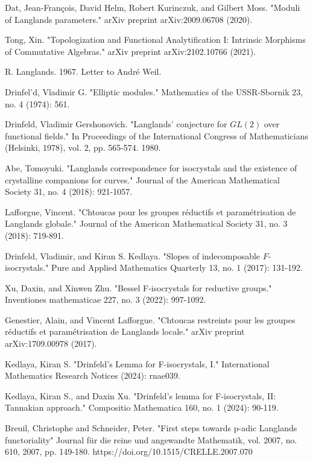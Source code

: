 \documentclass[12pt]{article}
\theoremstyle{definition}
\begin{document}
\newpage
\begin{thebibliography}{}

 Dat, Jean-Fran\c{c}ois, David Helm, Robert Kurinczuk, and Gilbert Moss. "Moduli of Langlands parameters." arXiv preprint arXiv:2009.06708 (2020).

 Tong, Xin. "Topologization and Functional Analytification I: Intrinsic Morphisms of Commutative Algebras." arXiv preprint arXiv:2102.10766 (2021).

 R. Langlands. 1967. Letter to Andr\'e Weil.

 Drinfel'd, Vladimir G. "Elliptic modules." Mathematics of the USSR-Sbornik 23, no. 4 (1974): 561.

 Drinfeld, Vladimir Gershonovich. "Langlands' conjecture for $GL(2)$ over functional fields." In Proceedings of the International Congress of Mathematicians (Helsinki, 1978), vol. 2, pp. 565-574. 1980.

 Abe, Tomoyuki. "Langlands correspondence for isocrystals and the existence of crystalline companions for curves." Journal of the American Mathematical Society 31, no. 4 (2018): 921-1057.

 Lafforgue, Vincent. "Chtoucas pour les groupes r\'eductifs et param\'etrisation de Langlands globale." Journal of the American Mathematical Society 31, no. 3 (2018): 719-891.

 Drinfeld, Vladimir, and Kiran S. Kedlaya. "Slopes of indecomposable $ F $-isocrystals." Pure and Applied Mathematics Quarterly 13, no. 1 (2017): 131-192.

 Xu, Daxin, and Xinwen Zhu. "Bessel F-isocrystals for reductive groups." Inventiones mathematicae 227, no. 3 (2022): 997-1092.

 Genestier, Alain, and Vincent Lafforgue. "Chtoucas restreints pour les groupes r\'eductifs et param\'etrisation de Langlands locale." arXiv preprint arXiv:1709.00978 (2017).

 Kedlaya, Kiran S. "Drinfeld's Lemma for F-isocrystals, I." International Mathematics Research Notices (2024): rnae039. 

 Kedlaya, Kiran S., and Daxin Xu. "Drinfeld's lemma for F-isocrystals, II: Tannakian approach." Compositio Mathematica 160, no. 1 (2024): 90-119.

 Breuil, Christophe and Schneider, Peter. "First steps towards p-adic Langlands functoriality" Journal f\"ur die reine und angewandte Mathematik, vol. 2007, no. 610, 2007, pp. 149-180. https://doi.org/10.1515/CRELLE.2007.070 
  

\end{thebibliography}
\end{document}
